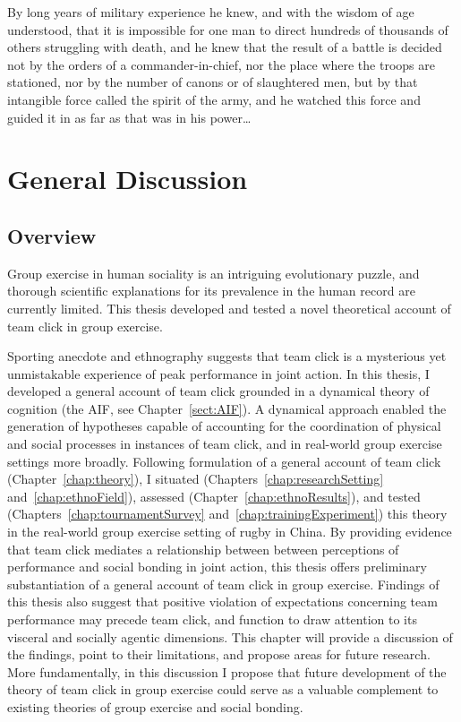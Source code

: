 
\begin{savequote}[8cm]
By long years of military experience he knew, and with the wisdom of age understood, that it is impossible for one man to direct hundreds of thousands of others struggling with death, and he knew that the result of a battle is decided not by the orders of a commander-in-chief, nor the place where the troops are stationed, nor by the number of canons or of slaughtered men, but by that intangible force called the spirit of the army, and he watched this force and guided it in as far as that was in his power\dots
\end{savequote}

\chapter{\label{chap:generalDiscussion}General Discussion}




\section{Overview}
Group exercise in human sociality is an intriguing evolutionary puzzle, and thorough scientific explanations for its prevalence in the human record are currently limited. This thesis developed and tested a novel theoretical account of team click in group exercise.

Sporting anecdote and ethnography suggests that team click is a mysterious yet unmistakable experience of peak performance in joint action.  In this thesis, I developed a general account of team click grounded in a dynamical theory of cognition (the AIF, see Chapter~\ref{sect:AIF}).  A dynamical approach enabled the generation of hypotheses capable of accounting for the coordination of physical and social processes in instances of team click, and in real-world group exercise settings more broadly.  Following formulation of a general account of team click (Chapter~\ref{chap:theory}), I situated (Chapters~\ref{chap:researchSetting} and~\ref{chap:ethnoField}), assessed (Chapter~\ref{chap:ethnoResults}), and tested (Chapters~\ref{chap:tournamentSurvey} and~\ref{chap:trainingExperiment}) this theory in the real-world group exercise setting of rugby in China.  By providing evidence that team click mediates a relationship between between perceptions of performance and social bonding in joint action, this thesis offers preliminary substantiation of a general account of team click in group exercise.  Findings of this thesis also suggest that positive violation of expectations concerning team performance may precede team click, and function to draw attention to its visceral and socially agentic dimensions.  This chapter will provide a discussion of the findings, point to their limitations, and propose areas for future research.  More fundamentally, in this discussion I propose that future development of the theory of team click in group exercise could serve as a valuable complement to existing theories of group exercise and social bonding.

